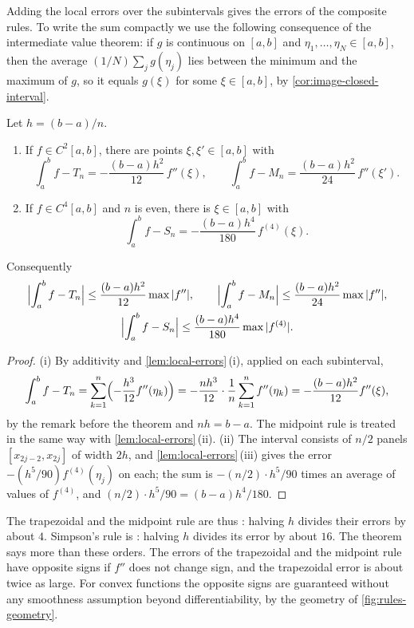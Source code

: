 Adding the local errors over the subintervals gives the errors of the composite rules. To write the sum compactly we use the following consequence of the intermediate value theorem: if $g$ is continuous on $[a,b]$ and $\eta_1,\ldots,\eta_N\in[a,b]$, then the average $(1/N)\sum_jg(\eta_j)$ lies between the minimum and the maximum of $g$, so it equals $g(\xi)$ for some $\xi\in[a,b]$, by \cref{cor:image-closed-interval}.

\begin{theorem}
\label{thm:quadrature-errors}
Let $h=(b-a)/n$.
\begin{enumerate}
\item If $f\in C^2[a,b]$, there are points $\xi,\xi'\in[a,b]$ with
\[
\int_a^bf-T_n=-\frac{(b-a)h^2}{12}\,f''(\xi),\qquad\int_a^bf-M_n=\frac{(b-a)h^2}{24}\,f''(\xi').
\]
\item If $f\in C^4[a,b]$ and $n$ is even, there is $\xi\in[a,b]$ with
\[
\int_a^bf-S_n=-\frac{(b-a)h^4}{180}\,f^{(4)}(\xi).
\]
\end{enumerate}
Consequently
\begin{gather*}
\Bigl|\int_a^bf-T_n\Bigr|\le\frac{(b-a)h^2}{12}\max|f''|,\qquad\Bigl|\int_a^bf-M_n\Bigr|\le\frac{(b-a)h^2}{24}\max|f''|,\\
\Bigl|\int_a^bf-S_n\Bigr|\le\frac{(b-a)h^4}{180}\max|f^{(4)}|.
\end{gather*}
\end{theorem}

\begin{proof}
(i) By additivity and \cref{lem:local-errors}\,(i), applied on each subinterval,
\[
\int_a^bf-T_n=\sum_{k=1}^n\Bigl(-\frac{h^3}{12}f''(\eta_k)\Bigr)=-\frac{nh^3}{12}\cdot\frac1n\sum_{k=1}^nf''(\eta_k)=-\frac{(b-a)h^2}{12}f''(\xi),
\]
by the remark before the theorem and $nh=b-a$. The midpoint rule is treated in the same way with \cref{lem:local-errors}\,(ii). (ii) The interval consists of $n/2$ panels $[x_{2j-2},x_{2j}]$ of width $2h$, and \cref{lem:local-errors}\,(iii) gives the error $-(h^5/90)f^{(4)}(\eta_j)$ on each; the sum is $-(n/2)\cdot h^5/90$ times an average of values of $f^{(4)}$, and $(n/2)\cdot h^5/90=(b-a)h^4/180$.
\end{proof}

The trapezoidal and the midpoint rule are thus : halving $h$ divides their errors by about $4$. Simpson's rule is : halving $h$ divides its error by about $16$. The theorem says more than these orders. The errors of the trapezoidal and the midpoint rule have opposite signs if $f''$ does not change sign, and the trapezoidal error is about twice as large. For convex functions the opposite signs are guaranteed without any smoothness assumption beyond differentiability, by the geometry of \cref{fig:rules-geometry}.

